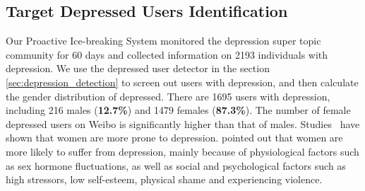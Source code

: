 
\subsection{Target Depressed Users Identification}
Our Proactive Ice-breaking System monitored the depression super topic community for 60 days and collected information on 2193 individuals with depression.
We use the depressed user detector in the section \ref{sec:depression_detection} to screen out users with depression, and then calculate the gender distribution of depressed.
There are 1695 users with depression, including 216 males (\textbf{12.7\%}) and 1479 females (\textbf{87.3\%}). The number of female depressed users on Weibo is significantly higher than that of males. Studies~\cite{ahmed2023chatbot} have shown that women are more prone to depression. \citet{kuehner2017depression,lu2021prevalence} pointed out that women are more likely to suffer from depression, mainly because of physiological factors such as sex hormone fluctuations, as well as social and psychological factors such as high stressors, low self-esteem, physical shame and experiencing violence.

